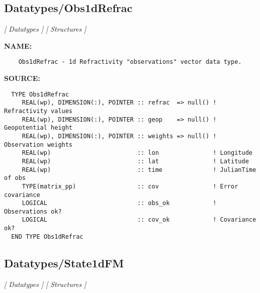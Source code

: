 \subsection{Datatypes/Obs1dRefrac}
\textsl{[ Datatypes ]}
\textsl{[ Structures ]}

\label{ch:robo37}
\label{ch:Datatypes_Obs1dRefrac}
\textbf{NAME:}\hspace{0.08in}\begin{Verbatim}
    Obs1dRefrac - 1d Refractivity "observations" vector data type.
\end{Verbatim}
\textbf{SOURCE:}\hspace{0.08in}\begin{Verbatim}
  TYPE Obs1dRefrac
     REAL(wp), DIMENSION(:), POINTER :: refrac  => null() ! Refractivity values
     REAL(wp), DIMENSION(:), POINTER :: geop    => null() ! Geopotential height
     REAL(wp), DIMENSION(:), POINTER :: weights => null() ! Observation weights
     REAL(wp)                        :: lon               ! Longitude
     REAL(wp)                        :: lat               ! Latitude
     REAL(wp)                        :: time              ! JulianTime of obs
     TYPE(matrix_pp)                 :: cov               ! Error covariance
     LOGICAL                         :: obs_ok            ! Observations ok?
     LOGICAL                         :: cov_ok            ! Covariance ok?
  END TYPE Obs1dRefrac
\end{Verbatim}
\subsection{Datatypes/State1dFM}
\textsl{[ Datatypes ]}
\textsl{[ Structures ]}

